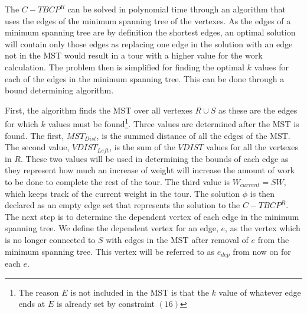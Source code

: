 \documentclass[sigconf, anonymous, pdftex]{acmart}
\begin{document}
The $C-TBCP^R$ can be solved in polynomial time through an algorithm that uses the edges of the minimum spanning tree of the vertexes. As the edges of a minimum spanning tree are by definition the shortest edges, an optimal solution will contain only those edges as replacing one edge in the solution with an edge not in the MST would result in a tour with a higher value for the work calculation. The problem then is simplified for finding the optimal $k$ values for each of the edges in the minimum spanning tree. This can be done through a bound determining algorithm.

First, the algorithm finds the MST over all vertexes $R \cup S$ as these are the edges for which $k$ values must be found\footnote{The reason $E$ is not included in the MST is that the $k$ value of whatever edge ends at $E$ is already set by constraint $(16)$}. Three values are determined after the MST is found. The first, $MST_{Dist}$, is the summed distance of all the edges of the MST. The second value, $VDIST_{Left}$, is the sum of the $VDIST$ values for all the vertexes in $R$. These two values will be used in determining the bounds of each edge as they represent how much an increase of weight will increase the amount of work to be done to complete the rest of the tour. The third value is $W_{current} = SW$, which keeps track of the current weight in the tour. The solution $\phi$ is then declared as an empty edge set that represents the solution to the $C-TBCP^R$. The next step is to determine the dependent vertex of each edge in the minimum spanning tree. We define the dependent vertex for an edge, $e$, as the vertex which is no longer connected to $S$ with edges in the MST after removal of $e$ from the minimum spanning tree. This vertex will be referred to as $e_{dep}$ from now on for each $e$.
\end{document}
